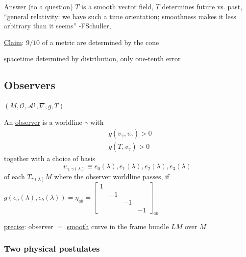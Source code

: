 	Answer (to a question) $T$ is a smooth vector field, $T$ determines future vs. past, ``general relativity: we have such a time orientation; smoothness makes it less arbitrary than it seems'' -FSchuller,
	
	
	\underline{Claim}: $9/10$ of a metric are determined by the cone
	
	spacetime determined by distribution, only one-tenth error 
	
	\subsection{Observers} $(M,\mathcal{O}, \mathcal{A}^{\uparrow},\nabla ,g, T)$
	\begin{definition}
		An \underline{observer} is a worldline $\gamma$ with
		\[
		\begin{aligned}
		& g(v_{\gamma}, v_{\gamma}) >  0 \\ 
		& g(T,v_{\gamma}) > 0 
		\end{aligned}
		\]
		together with a choice of basis
		\[
		v_{\gamma,\gamma(\lambda)} \equiv e_0(\lambda) , e_1(\lambda), e_2(\lambda), e_3(\lambda)
		\]
		of each $T_{\gamma(\lambda)}M$ where the observer worldline passes, if $g(e_a(\lambda), e_b(\lambda)) = \eta_{ab} = \left[ \begin{matrix} 1 & & & \\ & -1 & & \\ & & -1 & \\ & & & -1 \end{matrix} \right]_{ab}$
		
		\underline{precise}: observer $=$ \underline{smooth} curve in the frame bundle $LM$ over $M$
	\end{definition}
	
	\subsubsection{Two physical postulates}
	
